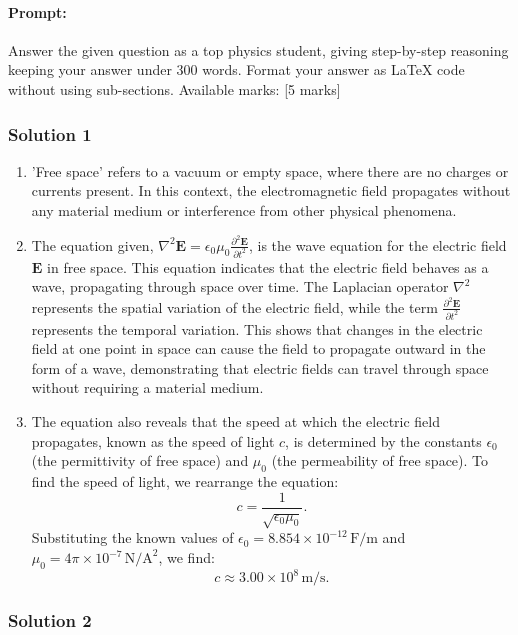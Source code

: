 \documentclass{article}
\begin{document}
\paragraph{Prompt: \\} 
Answer the given question as a top physics student, giving step-by-step reasoning keeping your answer under 300 words. Format your answer as LaTeX code without using sub-sections. Available marks: [5 marks]

\subsubsection{Solution 1}
\begin{enumerate}
    \item 'Free space' refers to a vacuum or empty space, where there are no charges or currents present. In this context, the electromagnetic field propagates without any material medium or interference from other physical phenomena.
    
    \item The equation given, $\nabla^2 \mathbf{E} = \epsilon_0 \mu_0 \frac{\partial^2 \mathbf{E}}{\partial t^2}$, is the wave equation for the electric field $\mathbf{E}$ in free space. This equation indicates that the electric field behaves as a wave, propagating through space over time. The Laplacian operator $\nabla^2$ represents the spatial variation of the electric field, while the term $\frac{\partial^2 \mathbf{E}}{\partial t^2}$ represents the temporal variation. This shows that changes in the electric field at one point in space can cause the field to propagate outward in the form of a wave, demonstrating that electric fields can travel through space without requiring a material medium.

    \item The equation also reveals that the speed at which the electric field propagates, known as the speed of light $c$, is determined by the constants $\epsilon_0$ (the permittivity of free space) and $\mu_0$ (the permeability of free space). To find the speed of light, we rearrange the equation:
    \[
    c = \frac{1}{\sqrt{\epsilon_0 \mu_0}}.
    \]
    Substituting the known values of $\epsilon_0 = 8.854 \times 10^{-12} \, \text{F/m}$ and $\mu_0 = 4\pi \times 10^{-7} \, \text{N/A}^2$, we find:
    \[
    c \approx 3.00 \times 10^8 \, \text{m/s}.
    \]
\end{enumerate}

\subsubsection{Solution 2}
\end{document}
